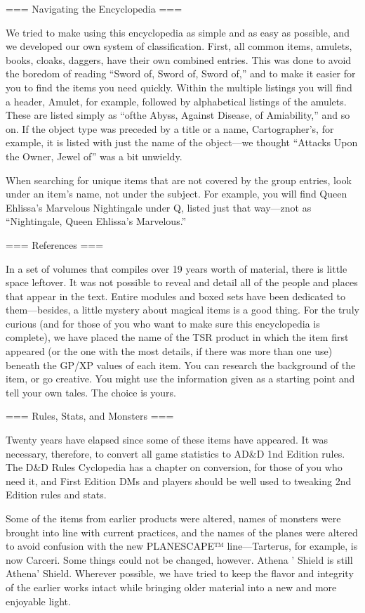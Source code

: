 === Navigating the Encyclopedia ===

We tried to make using this encyclopedia as simple and as easy as possible, and we developed our own system of classification. First, all common items, amulets, books, cloaks, daggers, have their own combined entries. This was done to avoid the boredom of reading “Sword of, Sword of, Sword of,” and to make it easier for you to find the items you need quickly. Within the multiple listings you will find a header, Amulet, for example, followed by alphabetical listings of the amulets. These are listed simply as “ofthe Abyss, Against Disease, of Amiability,” and so on. If the object type was preceded by a title or a name, Cartographer’s, for example, it is listed with just the name of the object—we thought “Attacks Upon the Owner, Jewel of” was a bit unwieldy.

When searching for unique items that are not covered by the group entries, look under an item’s name, not under the subject. For example, you will find Queen Ehlissa’s Marvelous Nightingale under Q, listed just that way—znot as “Nightingale, Queen Ehlissa’s Marvelous.”

=== References ===

In a set of volumes that compiles over 19 years worth of material, there is little space leftover. It was not possible to reveal and detail all of the people and places that appear in the text. Entire modules and boxed sets have been dedicated to them—besides, a little mystery about magical items is a good thing. For the truly curious (and for those of you who want to make sure this encyclopedia is complete), we have placed the name of the TSR product in which the item first appeared (or the one with the most details, if there was more than one use) beneath the GP/XP values of each item. You can research the background of the item, or go creative. You might use the information given as a starting point and tell your own tales. The choice is yours.

=== Rules, Stats, and Monsters ===

Twenty years have elapsed since some of these items have appeared. It was necessary, therefore, to convert all game statistics to AD&D 1nd Edition rules. The D&D Rules Cyclopedia has a chapter on conversion, for those of you who need it, and First Edition DMs and players should be well used to tweaking 2nd Edition rules and stats.

Some of the items from earlier products were altered, names of monsters were brought into line with current practices, and the names of the planes were altered to avoid confusion with the new PLANESCAPE™ line—Tarterus, for example, is now Carceri. Some things could not be changed, however. Athena ’ Shield is still Athena’ Shield. Wherever possible, we have tried to keep the flavor and integrity of the earlier works intact while bringing older material into a new and more enjoyable light.

